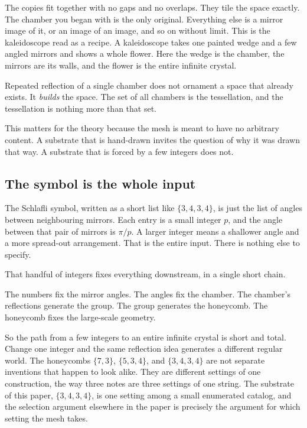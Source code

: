 The copies fit together with no gaps and no overlaps. They tile the space exactly. The chamber you began with is the only original. Everything else is a mirror image of it, or an image of an image, and so on without limit. This is the kaleidoscope read as a recipe. A kaleidoscope takes one painted wedge and a few angled mirrors and shows a whole flower. Here the wedge is the chamber, the mirrors are its walls, and the flower is the entire infinite crystal.

\begin{result}
Repeated reflection of a single chamber does not ornament a space that already exists. It \emph{builds} the space. The set of all chambers is the tessellation, and the tessellation is nothing more than that set.
\end{result}

This matters for the theory because the mesh is meant to have no arbitrary content. A substrate that is hand-drawn invites the question of why it was drawn that way. A substrate that is forced by a few integers does not.

\subsection{The symbol is the whole input}

The Schlafli symbol, written as a short list like $\{3,4,3,4\}$, is just the list of angles between neighbouring mirrors. Each entry is a small integer $p$, and the angle between that pair of mirrors is $\pi / p$. A larger integer means a shallower angle and a more spread-out arrangement. That is the entire input. There is nothing else to specify.

That handful of integers fixes everything downstream, in a single short chain.

\begin{principle}
The numbers fix the mirror angles. The angles fix the chamber. The chamber's reflections generate the group. The group generates the honeycomb. The honeycomb fixes the large-scale geometry.
\end{principle}

So the path from a few integers to an entire infinite crystal is short and total. Change one integer and the same reflection idea generates a different regular world. The honeycombs $\{7,3\}$, $\{5,3,4\}$, and $\{3,4,3,4\}$ are not separate inventions that happen to look alike. They are different settings of one construction, the way three notes are three settings of one string. The substrate of this paper, $\{3,4,3,4\}$, is one setting among a small enumerated catalog, and the selection argument elsewhere in the paper is precisely the argument for which setting the mesh takes.

